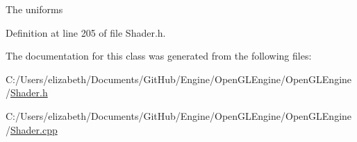 The uniforms 



Definition at line 205 of file Shader.\+h.



The documentation for this class was generated from the following files\+:\begin{DoxyCompactItemize}
\item 
C\+:/\+Users/elizabeth/\+Documents/\+Git\+Hub/\+Engine/\+Open\+G\+L\+Engine/\+Open\+G\+L\+Engine/\hyperlink{_shader_8h}{Shader.\+h}\item 
C\+:/\+Users/elizabeth/\+Documents/\+Git\+Hub/\+Engine/\+Open\+G\+L\+Engine/\+Open\+G\+L\+Engine/\hyperlink{_shader_8cpp}{Shader.\+cpp}\end{DoxyCompactItemize}
